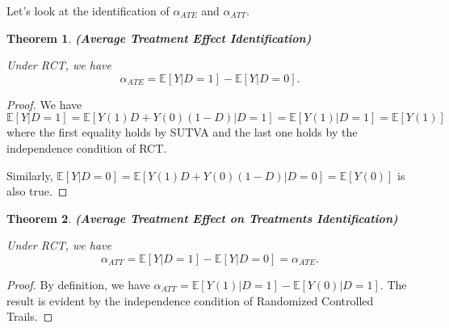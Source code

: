 \documentclass[11pt,a4paper]{amsart}
\theoremstyle{plain}
\newtheorem{theorem}{Theorem}
\theoremstyle{definition}
\begin{document}
	Let's look at the identification of $\alpha_{ATE}$ and $\alpha_{ATT}$. 
	
	\begin{theorem}\label{ident., RCT}
		\textbf{(Average Treatment Effect Identification)} 
		
		Under RCT, we have
		\[	\alpha_{ATE} =  \mathbb{E}[Y|D=1] - \mathbb{E}[Y|D=0].	\]
	\end{theorem}
	\begin{proof}
		We have  $\mathbb{E}[Y|D=1] = \mathbb{E}[Y(1)D + Y(0)(1-D) | D = 1] = \mathbb{E}[Y(1)|D=1] = \mathbb{E}[Y(1)]$ where the first equality holds by SUTVA and the last one holds by the independence condition of RCT. \par 
		Similarly, $\mathbb{E}[Y|D=0] = \mathbb{E}[Y(1)D + Y(0)(1-D) | D=0] = \mathbb{E}[Y(0)]$ is also true.
	\end{proof}

	\begin{theorem}
			\textbf{(Average Treatment Effect on Treatments Identification)} 
			
			Under RCT, we have
			\[	\alpha_{ATT}  = \mathbb{E}[Y|D=1] - \mathbb{E}[Y|D=0] = \alpha_{ATE}.	\]
	\end{theorem}
	\begin{proof}
		By definition, we have $\alpha_{ATT} = \mathbb{E}[Y(1) | D=1] - \mathbb{E}[Y(0)|D=1]$. The result is evident by the independence condition of Randomized Controlled Trails.
	\end{proof}
\end{document}
